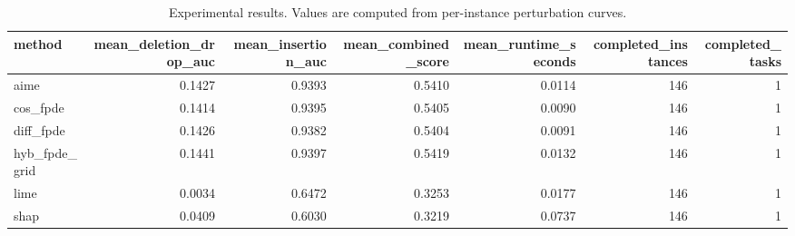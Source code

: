 \begin{table}[t]
\caption{Experimental results. Values are computed from per-instance perturbation curves.}
\label{tab:main_results_computed}
\centering
\begin{tabular}{lrrrrrr}
\toprule
method & mean\_deletion\_drop\_auc & mean\_insertion\_auc & mean\_combined\_score & mean\_runtime\_seconds & completed\_instances & completed\_tasks \\
\midrule
aime & 0.1427 & 0.9393 & 0.5410 & 0.0114 & 146 & 1 \\
cos\_fpde & 0.1414 & 0.9395 & 0.5405 & 0.0090 & 146 & 1 \\
diff\_fpde & 0.1426 & 0.9382 & 0.5404 & 0.0091 & 146 & 1 \\
hyb\_fpde\_grid & 0.1441 & 0.9397 & 0.5419 & 0.0132 & 146 & 1 \\
lime & 0.0034 & 0.6472 & 0.3253 & 0.0177 & 146 & 1 \\
shap & 0.0409 & 0.6030 & 0.3219 & 0.0737 & 146 & 1 \\
\bottomrule
\end{tabular}

\end{table}
